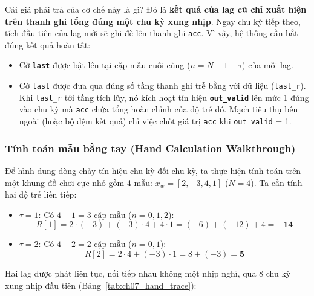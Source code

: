 Cái giá phải trả của cơ chế này là gì? Đó là \textbf{kết quả của lag cũ chỉ xuất hiện trên thanh ghi tổng đúng một chu kỳ xung nhịp}. Ngay chu kỳ tiếp theo, tích đầu tiên của lag mới sẽ ghi đè lên thanh ghi \texttt{acc}. Vì vậy, hệ thống cần bắt đúng kết quả hoàn tất:
\begin{itemize}[leftmargin=1.5em, itemsep=2pt]
    \item Cờ \textbf{\texttt{last}} được bật lên tại cặp mẫu cuối cùng ($n = N - 1 - \tau$) của mỗi lag.
    \item Cờ \texttt{last} được đưa qua đúng số tầng thanh ghi trễ bằng với dữ liệu (\texttt{last\_r}). Khi \texttt{last\_r} tới tầng tích lũy, nó kích hoạt tín hiệu \textbf{\texttt{out\_valid}} lên mức 1 đúng vào chu kỳ mà \texttt{acc} chứa tổng hoàn chỉnh của độ trễ đó. Mạch tiêu thụ bên ngoài (hoặc bộ đệm kết quả) chỉ việc chốt giá trị \texttt{acc} khi \texttt{out\_valid} = 1.
\end{itemize}

\subsubsection*{Tính toán mẫu bằng tay (Hand Calculation Walkthrough)}
Để hình dung dòng chảy tín hiệu chu kỳ-đối-chu-kỳ, ta thực hiện tính toán trên một khung đồ chơi cực nhỏ gồm 4 mẫu: $x_w = [2, -3, 4, 1]$ ($N = 4$). Ta cần tính hai độ trễ liên tiếp:
\begin{itemize}[leftmargin=1.5em, itemsep=2pt]
    \item $\tau = 1$: Có $4 - 1 = 3\text{ cặp mẫu}$ ($n = 0, 1, 2$):
    \begin{equation}
    R[1] = 2 \cdot (-3) + (-3) \cdot 4 + 4 \cdot 1 = (-6) + (-12) + 4 = \mathbf{-14}
    \end{equation}
    \item $\tau = 2$: Có $4 - 2 = 2\text{ cặp mẫu}$ ($n = 0, 1$):
    \begin{equation}
    R[2] = 2 \cdot 4 + (-3) \cdot 1 = 8 + (-3) = \mathbf{5}
    \end{equation}
\end{itemize}

Hai lag được phát liên tục, nối tiếp nhau không một nhịp nghỉ, qua 8 chu kỳ xung nhịp đầu tiên (Bảng~\ref{tab:ch07_hand_trace}):

